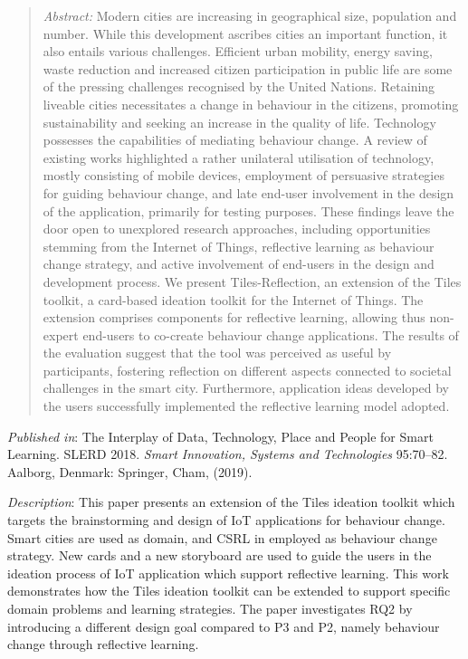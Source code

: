 \begin{quote}
	\emph{Abstract:} Modern cities are increasing in geographical size, population and number. While this development ascribes cities an important function, it also entails various challenges. Efficient urban mobility, energy saving, waste reduction and increased citizen participation in public life are some of the pressing challenges recognised by the United Nations. Retaining liveable cities necessitates a change in behaviour in the citizens, promoting sustainability and seeking an increase in the quality of life. Technology possesses the capabilities of mediating behaviour change. A review of existing works highlighted a rather unilateral utilisation of technology, mostly consisting of mobile devices, employment of persuasive strategies for guiding behaviour change, and late end-user involvement in the design of the application, primarily for testing purposes. These findings leave the door open to unexplored research approaches, including opportunities stemming from the Internet of Things, reflective learning as behaviour change strategy, and active involvement of end-users in the design and development process. We present Tiles-Reflection, an extension of the Tiles toolkit, a card-based ideation toolkit for the Internet of Things. The extension comprises components for reflective learning, allowing thus non-expert end-users to co-create behaviour change applications. The results of the evaluation suggest that the tool was perceived as useful by participants, fostering reflection on different aspects connected to societal challenges in the smart city. Furthermore, application ideas developed by the users successfully implemented the reflective learning model adopted.
\end{quote}

\emph{Published in}: The Interplay of Data, Technology, Place and People for Smart Learning. SLERD 2018. \emph{Smart Innovation, Systems and Technologies} 95:70--82. Aalborg, Denmark: Springer, Cham, (2019).

\emph{Description}: This paper presents an extension of the Tiles ideation toolkit which targets the brainstorming and design of IoT applications for behaviour change. Smart cities are used as domain, and CSRL in employed as behaviour change strategy. New cards and a new storyboard are used to guide the users in the ideation process of IoT application which support reflective learning. This work demonstrates how the Tiles ideation toolkit can be extended to support specific domain problems and learning strategies. The paper investigates RQ2 by introducing a different design goal compared to P3 and P2, namely behaviour change through reflective learning.


